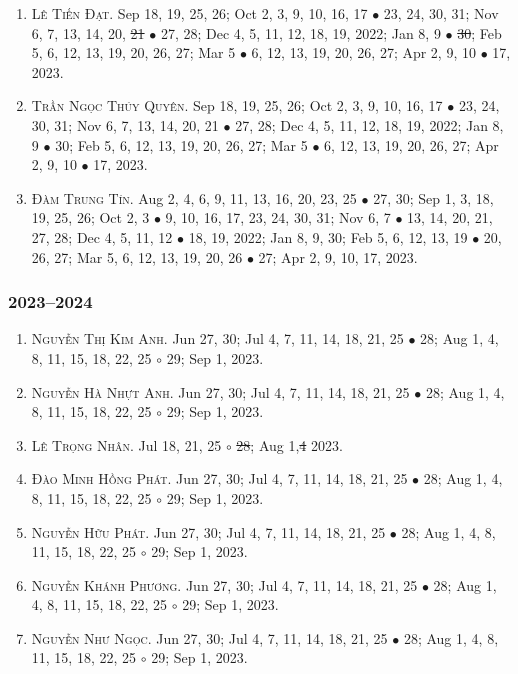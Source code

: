 \documentclass{article}
\begin{document}
\begin{enumerate}
	\item \textsc{Lê Tiến Đạt.} {\sf[In]} Sep 18, 19, 25, 26; Oct 2, 3, 9, 10, 16, 17 $\bullet$ 23, 24, 30, 31; Nov 6, 7, 13, 14, 20, \st{21} $\bullet$ 27, 28; Dec 4, 5, 11, 12, 18, 19, 2022; Jan 8, 9 $\bullet$ \st{30}; Feb 5, 6, 12, 13, 19, 20, 26, 27; Mar 5 $\bullet$ 6, 12, 13, 19, 20, 26, 27; Apr 2, 9, 10 $\bullet$ 17, 2023.
	\item \textsc{Trần Ngọc Thúy Quyên.} {\sf[In]} Sep 18, 19, 25, 26; Oct 2, 3, 9, 10, 16, 17 $\bullet$ 23, 24, 30, 31; Nov 6, 7, 13, 14, 20, 21 $\bullet$ 27, 28; Dec 4, 5, 11, 12, 18, 19, 2022; Jan 8, 9 $\bullet$ 30; Feb 5, 6, 12, 13, 19, 20, 26, 27; Mar 5 $\bullet$ 6, 12, 13, 19, 20, 26, 27; Apr 2, 9, 10 $\bullet$ 17, 2023.
	\item \textsc{Đàm Trung Tín.} {\sf[In]} Aug 2, 4, 6, 9, 11, 13, 16, 20, 23, 25 $\bullet$ 27, 30; Sep 1, 3, 18, 19, 25, 26; Oct 2, 3 $\bullet$ 9, 10, 16, 17, 23, 24, 30, 31; Nov 6, 7 $\bullet$ 13, 14, 20, 21, 27, 28; Dec 4, 5, 11, 12 $\bullet$ 18, 19, 2022; Jan 8, 9, 30; Feb 5, 6, 12, 13, 19 $\bullet$ 20, 26, 27; Mar 5, 6, 12, 13, 19, 20, 26 $\bullet$ 27; Apr 2, 9, 10, 17, 2023. {\sf[Out]}
\end{enumerate}

\subsubsection{2023--2024}

\begin{enumerate}
	\item \textsc{Nguyễn Thị Kim Anh.} {\sf[In]} Jun 27, 30; Jul 4, 7, 11, 14, 18, 21, 25 $\bullet$ 28; Aug 1, 4, 8, 11, 15, 18, 22, 25 $\circ$ 29; Sep 1, 2023.
	\item \textsc{Nguyễn Hà Nhựt Anh.} {\sf[In]} Jun 27, 30; Jul 4, 7, 11, 14, 18, 21, 25 $\bullet$ 28; Aug 1, 4, 8, 11, 15, 18, 22, 25 $\circ$ 29; Sep 1, 2023.
	\item \textsc{Lê Trọng Nhân.} {\sf[In]} Jul 18, 21, 25 $\circ$ \st{28}; Aug 1,\st{4} \sf{[Out]} 2023.
	\item \textsc{Đào Minh Hồng Phát.} {\sf[In]} Jun 27, 30; Jul 4, 7, 11, 14, 18, 21, 25 $\bullet$ 28; Aug 1, 4, 8, 11, 15, 18, 22, 25 $\circ$ 29; Sep 1, 2023.
	\item \textsc{Nguyễn Hữu Phát.} {\sf[In]} Jun 27, 30; Jul 4, 7, 11, 14, 18, 21, 25 $\bullet$ 28; Aug 1, 4, 8, 11, 15, 18, 22, 25 $\circ$ 29; Sep 1, 2023.	
	\item \textsc{Nguyễn Khánh Phương.} {\sf[In]} Jun 27, 30; Jul 4, 7, 11, 14, 18, 21, 25 $\bullet$ 28; Aug 1, 4, 8, 11, 15, 18, 22, 25 $\circ$ 29; Sep 1, 2023.
	\item \textsc{Nguyễn Như Ngọc.} {\sf[In]} Jun 27, 30; Jul 4, 7, 11, 14, 18, 21, 25 $\bullet$ 28; Aug 1, 4, 8, 11, 15, 18, 22, 25 $\circ$ 29; Sep 1, 2023.
\end{enumerate}
\end{document}
